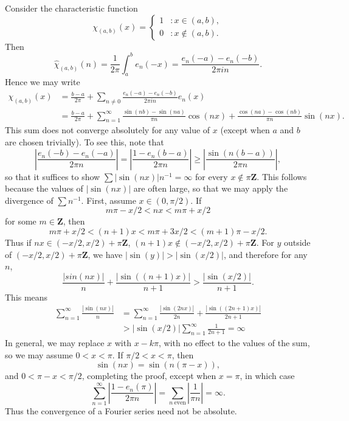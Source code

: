 \begin{example}
    Consider the characteristic function
    \[ \chi_{(a,b)}(x) = \begin{cases} 1 & : x \in (a,b), \\ 0 & : x \not \in (a,b). \end{cases} \]
    Then
    \[ \widehat{\chi}_{(a,b)}(n) = \frac{1}{2\pi} \int_a^b e_n(-x) = \frac{e_n(-a) - e_n(-b)}{2\pi i n}. \]
    Hence we may write
    \begin{align*}
        \chi_{(a,b)}(x) &= \frac{b-a}{2\pi} + \sum_{n \neq 0} \frac{e_n(-a) - e_n(-b)}{2 \pi i n} e_n(x)\\
        &= \frac{b-a}{2\pi} + \sum_{n = 1}^\infty \frac{\sin(nb) - \sin(na)}{\pi n} \cos(nx) + \frac{\cos(na) - \cos(nb)}{\pi n} \sin(nx).
    \end{align*}
    This sum does not converge absolutely for any value of $x$ (except when $a$ and $b$ are chosen trivially). To see this, note that
    \[ \left|\frac{e_n(-b) - e_n(-a)}{2 \pi n}\right| = \left| \frac{1 - e_n(b-a)}{2 \pi n} \right| \geq \left| \frac{\sin(n(b-a))}{2 \pi n} \right|, \]
    so that it suffices to show $\sum |\sin(nx)| n^{-1} = \infty$ for every $x \not \in \pi \mathbf{Z}$. This follows because the values of $|\sin(nx)|$ are often large, so that we may apply the divergence of $\sum n^{-1}$. First, assume $x \in (0,\pi/2)$. If
    \[ m \pi - x/2 < nx < m \pi + x/2 \]
    for some $m \in \mathbf{Z}$, then
    \[ m \pi + x/2 < (n+1)x < m \pi + 3x/2 < (m+1) \pi - x/2. \]
    Thus if $nx \in (-x/2,x/2) + \pi \mathbf{Z}$, $(n+1)x \not \in (-x/2,x/2) + \pi \mathbf{Z}$. For $y$ outside of $(-x/2,x/2) + \pi \mathbf{Z}$, we have $|\sin(y)| > |\sin(x/2)|$, and therefore for any $n$,
    \[ \frac{|sin(nx)|}{n} + \frac{|\sin((n+1)x)|}{n+1} > \frac{|\sin(x/2)|}{n+1}. \]
    This means
    \begin{align*}
        \sum_{n = 1}^\infty \frac{|\sin(nx)|}{n} &= \sum_{n = 1}^\infty \frac{|\sin(2nx)|}{2n} + \frac{|\sin((2n+1)x)|}{2n+1}\\
        &> |\sin(x/2)| \sum_{n = 1}^\infty \frac{1}{2n+1} = \infty
    \end{align*}
    In general, we may replace $x$ with $x - k \pi$, with no effect to the values of the sum, so we may assume $0 < x < \pi$. If $\pi/2 < x < \pi$, then
    \[ \sin(nx) = \sin(n(\pi - x)), \]
    and $0 < \pi - x < \pi/2$, completing the proof, except when $x = \pi$, in which case
    \[ \sum_{n = 1}^\infty \left| \frac{1 - e_n(\pi)}{2 \pi n} \right| = \sum_{n\ \text{even}} \left| \frac{1}{\pi n} \right| = \infty. \]
    Thus the convergence of a Fourier series need not be absolute.
\end{example}

